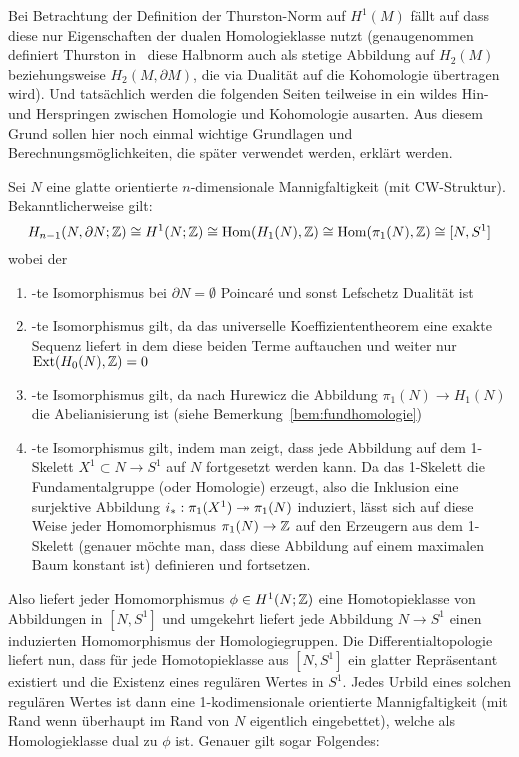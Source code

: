 	Bei Betrachtung der Definition der Thurston-Norm auf $H^1(M)$ fällt auf dass diese nur Eigenschaften der dualen Homologieklasse nutzt (genaugenommen definiert Thurston in~\cite{Thurston.1986} diese Halbnorm auch als stetige Abbildung auf $H_2(M)$ beziehungsweise $H_2(M,\partial M)$, die via Dualität auf die Kohomologie übertragen wird). Und tatsächlich werden die folgenden Seiten teilweise in ein wildes Hin- und Herspringen zwischen Homologie und Kohomologie ausarten. Aus diesem Grund sollen hier noch einmal wichtige Grundlagen und Berechnungsmöglichkeiten, die später verwendet werden, erklärt werden.
	\begin{bem}
	Sei $N$ eine glatte orientierte $n$-dimensionale Mannigfaltigkeit (mit CW-Struktur).
		Bekanntlicherweise gilt:
		\[
					H_{n-1}(N,\partial N;\mathbb{Z})\cong H^1(N;\mathbb{Z}) \cong \operatorname{Hom}(H_1(N),\mathbb{Z}) \cong \operatorname{Hom}(\pi_1(N),\mathbb{Z}) \cong  [N,S^1]
		\]		
		wobei der
		\begin{enumerate}
			\item -te Isomorphismus bei $\partial N= \emptyset$ Poincaré und sonst Lefschetz Dualität ist
			\item -te Isomorphismus gilt, da das universelle Koeffiziententheorem eine exakte Sequenz liefert in dem diese beiden Terme auftauchen und weiter nur $\operatorname{Ext}(H_0(N),\mathbb{Z}) = 0$
			\item -te Isomorphismus gilt, da nach Hurewicz die Abbildung $\pi_1(N)\to H_1(N)$ die Abelianisierung ist (siehe Bemerkung~\ref{bem:fundhomologie})
			\item -te Isomorphismus gilt, indem man zeigt, dass jede Abbildung auf dem 1-Skelett $X^1 \subset N \to S^1$ auf $N$ fortgesetzt werden kann. Da das 1-Skelett die Fundamentalgruppe (oder Homologie) erzeugt, also die Inklusion eine surjektive Abbildung $i_*:\pi_1(X^1)\twoheadrightarrow\pi_1(N)$ induziert, lässt sich auf diese Weise jeder Homomorphismus $\pi_1(N)\to \mathbb{Z}$ auf den Erzeugern aus dem 1-Skelett (genauer möchte man, dass diese Abbildung auf einem maximalen Baum konstant ist) definieren und fortsetzen. 
		\end{enumerate}
	Also liefert jeder Homomorphismus $\phi \in H^1(N;\mathbb{Z})$ eine Homotopieklasse von Abbildungen in $[N,S^1]$ und umgekehrt liefert jede Abbildung $N\to S^1$ einen induzierten Homomorphismus der Homologiegruppen. Die Differentialtopologie liefert nun, dass für jede Homotopieklasse aus $[N,S^1]$ ein glatter Repräsentant existiert und die Existenz eines regulären Wertes in $S^1$. Jedes Urbild eines solchen regulären Wertes ist dann eine 1-kodimensionale orientierte Mannigfaltigkeit (mit Rand wenn überhaupt im Rand von $N$ eigentlich eingebettet), welche als Homologieklasse dual zu $\phi$ ist. Genauer gilt sogar Folgendes:
	\end{bem}
